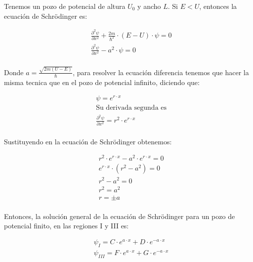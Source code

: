 \documentclass[a4paper]{article}
\begin{document}
            \indent Tenemos un pozo de potencial de altura $U_0$ y ancho $L$. Si $E < U$, entonces la ecuación de Schrödinger es:

            \begin{align*}
                &\frac{\partial^2 \psi} {\partial x^2} + \frac{2m}{\hbar^2} \cdot (E - U) \cdot \psi = 0\\
                &\frac{\partial^2 \psi} {\partial x^2} - a^2 \cdot \psi = 0\\
            \end{align*}

            \indent Donde $a = \frac{\sqrt{2m(U - E)}}{\hbar}$, para resolver la ecuación diferencia tenemos que hacer la misma tecnica que en el pozo de potencial infinito, diciendo que:

            \begin{align*}
                &\psi = e^{r \cdot x} \\
                &\text{Su derivada segunda es} \\
                &\frac{\partial^2 \psi} {\partial x^2} = r^2 \cdot e^{r \cdot x} \\
            \end{align*}

            \indent Sustituyendo en la ecuación de Schrödinger obtenemos:

            \saltoPag

            \begin{align*}
                &r^2 \cdot e^{r \cdot x} - a^2 \cdot e^{r \cdot x} = 0 \\
                &e^{r \cdot x} \cdot (r^2 - a^2) = 0 \\
                &r^2 - a^2 = 0 \\
                &r^2 = a^2 \\
                &r = \pm a \\
            \end{align*}

            \indent Entonces, la solución general de la ecuación de Schrödinger para un pozo de potencial finito, en las regiones I y III es:

            \begin{align*}
                &\psi_I = C \cdot e^{a \cdot x} + D \cdot e^{-a \cdot x} \\ 
                &\psi_{III} = F \cdot e^{a \cdot x} + G \cdot e^{-a \cdot x} \\
            \end{align*}
\end{document}
